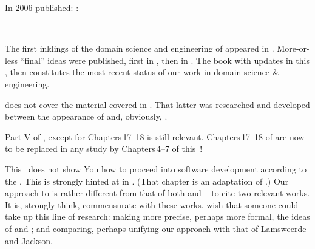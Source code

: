 
\begynd
\pind In 2006  published: \cite{TheSEBook1,TheSEBook2,TheSEBook3}:
\afslut

\begin{center}
\ \
\ \
\end{center}

\label{Domain Engineering 2016 2022}

\begynd
\pind The first inklings of the domain science and engineering of
      \cite{BjornerMonograph2020} appeared in \cite[2010]{Kiev:2010ptI,Kiev:2010ptII}.
\pind More-or-less ``final'' ideas were published, first in \cite[2017]{BjornerFAoC2015MDAAD},
      then in \cite[March 2019]{BjornerTOSEM2018}.
\pind The book \cite{BjornerMonograph2020} with updates in this
      \primer, then constitutes the most recent status of our work in domain
      science \& engineering. 

\pind \cite[Software Engineering, III, Part V]{TheSEBook3} does not
      cover the  material covered in
      \cite[Chapter 8: Domain Facets]{BjornerMonograph2020}.
\begynd
\pind That latter was researched \cite{dines:facs:2008} and developed between the appearance
      of \cite{TheSEBook3} and, obviously, \cite{BjornerMonograph2020}.
\afslut
\afslut

\begynd
\pind Part V of \cite{TheSEBook3}, except for Chapters\,17--18 is
      still relevant.
\pind Chapters\,17--18 of \cite{TheSEBook3} are now to be replaced in
      any study by Chapters\,4--7 of \cite{BjornerMonograph2020} 
      this \primer\,!
\afslut


\begynd
\pind This \primer\ does not show You how to proceed into software
      development according to the .
\begynd
\pind This is strongly hinted at in \cite[Chapter 9]{BjornerMonograph2020}.
\pind (That chapter is an adaptation of \cite[May 2008]{dines:ugo65:2008}.)
\pind Our approach to \sfsl{requirements engineering} is rather
      different from that of both \cite[A. van Laamswerde]{Lamsweerde}
      and \cite[M.\ A.\ Jackson]{Jackson2010Facs} -- to cite 
      two relevant works.
\pind It is, \ysfchg{we } strongly think, commensurate with these works.
\pind  \ysfchg{We } wish that someone could take up this line of research:
\begynd
\pind making more precise, perhaps more formal, the ideas of
       and ;
\pind and comparing, perhaps unifying our approach with that of
      Lamsweerde and Jackson.
\afslut
\afslut
\afslut

